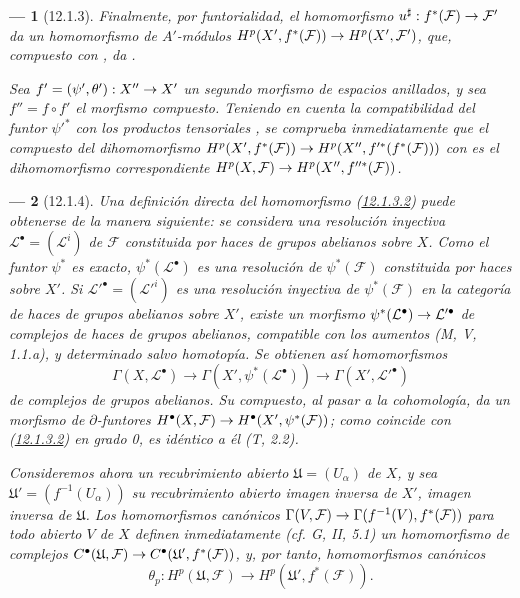 \documentclass[10pt,oneside,openany]{book}
\theoremstyle{egaenv}\newtheorem*{env}{---}
\theoremstyle{egastatement}
\theoremstyle{egadescription}
\renewcommand{\to}{\mathchoice{\longrightarrow}{\rightarrow}{\rightarrow}{\rightarrow}}
\begin{document}
\begin{env}[12.1.3]
Finalmente, por funtorialidad, el homomorfismo
$u^\sharp:f^*(\mathcal F)\to\mathcal F'$ da un homomorfismo de
$A'$-módulos
$H^p(X',f^*(\mathcal F))\to H^p(X',\mathcal F')$,
que, compuesto con , da
.

Sea $f'=(\psi',\theta'):X''\to X'$ un segundo morfismo de espacios
anillados, y sea $f''=f\circ f'$ el morfismo compuesto.
Teniendo en cuenta la compatibilidad del funtor $\psi'^*$ con los
productos tensoriales , se comprueba
inmediatamente que el compuesto del dihomomorfismo
$H^p(X',f^*(\mathcal F))\to H^p(X'',f'^*(f^*(\mathcal F)))$
con  es el dihomomorfismo correspondiente
$H^p(X,\mathcal F)\to H^p(X'',f''^*(\mathcal F))$.
\end{env}

\begin{env}[12.1.4]
\label{0.12.1.4-fr}
Una definición directa del homomorfismo (\hyperref[0.12.1.3.2-fr]{12.1.3.2}) puede obtenerse de la manera siguiente: se considera una resolución inyectiva $\mathcal L^\bullet=(\mathcal L^i)$ de $\mathcal F$ constituida por haces de
grupos abelianos sobre $X$.
Como el funtor $\psi^*$ es exacto,
$\psi^*(\mathcal L^\bullet)$ es una \emph{resolución} de $\psi^*(\mathcal F)$
constituida por haces sobre $X'$.
Si $\mathcal L'^\bullet=(\mathcal L'^i)$ es una resolución inyectiva de
$\psi^*(\mathcal F)$ en la categoría de haces de grupos abelianos sobre
$X'$, existe un morfismo
$\psi^*(\mathcal L^\bullet)\to\mathcal L'^\bullet$
de complejos de haces de grupos abelianos, compatible con los
aumentos (M, V, 1.1.\emph{a)}, y determinado salvo homotopía.
Se obtienen así homomorfismos
\[
\Gamma(X,\mathcal L^\bullet)\longrightarrow
\Gamma(X',\psi^*(\mathcal L^\bullet))\longrightarrow
\Gamma(X',\mathcal L'^\bullet)
\]
de complejos de grupos abelianos.
Su compuesto, al pasar a la cohomología, da un morfismo de
$\partial$-funtores
$H^\bullet(X,\mathcal F)\to H^\bullet(X',\psi^*(\mathcal F))$; como coincide con (\hyperref[0.12.1.3.2-fr]{12.1.3.2}) en grado 0, es idéntico a él (T, 2.2).

Consideremos ahora un \emph{recubrimiento abierto}
$\mathfrak U=(U_\alpha)$ de $X$, y sea
$\mathfrak U'=(f^{-1}(U_\alpha))$ su recubrimiento abierto imagen inversa
de $X'$, imagen inversa de $\mathfrak U$. Los homomorfismos canónicos $\Gamma(V,\mathcal F)\to\Gamma(f^{-1}(V),f^*(\mathcal F))$ para todo abierto $V$ de $X$ definen inmediatamente (cf. G, II, 5.1) un homomorfismo de complejos
$C^\bullet(\mathfrak U,\mathcal F)\to
C^\bullet(\mathfrak U',f^*(\mathcal F))$,
y, por tanto, homomorfismos canónicos
\[
\label{0.12.1.4.1-fr}
\tag{12.1.4.1}
\theta_p:H^p(\mathfrak U,\mathcal F)
\longrightarrow H^p(\mathfrak U',f^*(\mathcal F)).
\]


\end{env}
\end{document}
